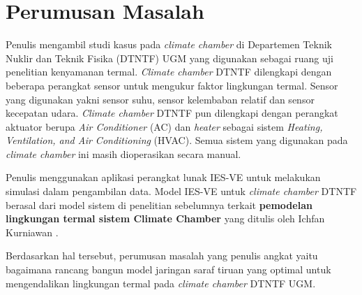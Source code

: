 
\section{Perumusan Masalah}
Penulis mengambil studi kasus pada \textit{climate chamber} di Departemen Teknik Nuklir dan Teknik Fisika (DTNTF) UGM yang digunakan sebagai ruang uji penelitian kenyamanan termal. \textit{Climate chamber} DTNTF dilengkapi dengan beberapa perangkat sensor untuk mengukur faktor lingkungan termal. Sensor yang digunakan yakni sensor suhu, sensor kelembaban relatif dan sensor kecepatan udara. \textit{Climate chamber} DTNTF pun dilengkapi dengan perangkat aktuator berupa \textit{Air Conditioner} (AC) dan \textit{heater} sebagai sistem \textit{Heating, Ventilation, and Air Conditioning} (HVAC). Semua sistem yang digunakan pada \textit{climate chamber} ini masih dioperasikan secara manual.

Penulis menggunakan aplikasi perangkat lunak IES-VE untuk melakukan simulasi dalam pengambilan data. Model IES-VE untuk \textit{climate chamber} DTNTF berasal dari model sistem di penelitian sebelumnya terkait \textbf{pemodelan lingkungan termal sistem Climate Chamber} yang ditulis oleh Ichfan Kurniawan \cite{skripsi1}.

Berdasarkan hal tersebut, perumusan masalah yang penulis angkat yaitu bagaimana rancang bangun model jaringan saraf tiruan yang optimal untuk mengendalikan lingkungan termal pada \textit{climate chamber} DTNTF UGM.

